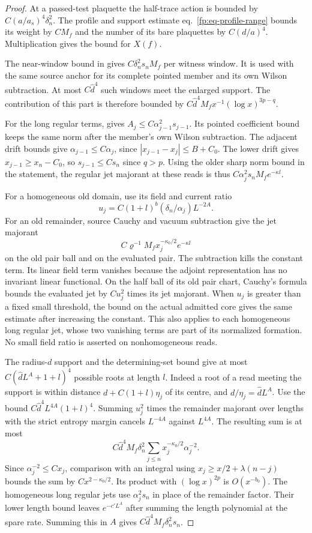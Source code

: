 \documentclass[11pt,letterpaper,reqno]{amsart}
\numberwithin{equation}{section}
\renewcommand{\eqref}[1]{\textup{eq.~\ref{#1}}}
\theoremstyle{definition}
\theoremstyle{remark}
\begin{document}
\begin{proof}
At a passed-test plaquette the half-trace action is bounded
by \(C(a/a_s)^4\delta_n^2\). The profile and support estimate
\eqref{fp:eq-profile-range} bounds its weight by \(CM_f\)
and the number of its bare plaquettes by \(C(d/a)^4\).
Multiplication gives the bound for \(X(f)\).

The near-window bound in \cite[Proposition~5.6]{SI} gives
\(C\delta_n^2s_n M_f\) per witness window. It is used with the
same source anchor for its complete pointed member and its
own Wilson subtraction. At most \(C\widehat d^4\) such windows
meet the enlarged support. The contribution of this part is
therefore bounded by \(C\widehat d^4 M_f x^{-1}
(\log x)^{3p-q}\).

For the long regular terms, \cite[Proposition~5.6]{SI} gives
\(A_j\le C\alpha_{j-1}^2s_{j-1}\). Its pointed coefficient bound
keeps the same norm after the member's own Wilson subtraction.
The adjacent drift bounds give \(\alpha_{j-1}\le C\alpha_j\), since
\(|x_{j-1}-x_j|\le B+C_0\). The lower drift gives
\(x_{j-1}\ge x_n-C_0\), so \(s_{j-1}\le C s_n\) since \(q>p\).
Using the older sharp norm bound in the statement, the regular
jet majorant at these reads is thus
\(C\alpha_j^2s_n M_f e^{-\kappa l}\).

For a homogeneous old domain, use its field and current ratio
\[
 u_j=C(1+l)^b(\delta_n/\alpha_j)L^{-2A}.
\]
For an old remainder, source Cauchy and vacuum subtraction
give the jet majorant
\[
 C\varrho^{-1}M_f x_j^{-\kappa_0/2}e^{-\kappa l}
\]
on the old pair ball and on the evaluated pair. The subtraction
kills the constant term. Its linear field term vanishes because the
adjoint representation has no invariant linear functional.
On the half ball of its old pair chart, Cauchy's formula
bounds the evaluated jet by \(C u_j^2\) times its jet
majorant. When \(u_j\) is greater than a fixed small threshold,
the bound on the actual admitted core gives the same estimate
after increasing the constant. This also applies to each
homogeneous long regular jet, whose two vanishing terms are
part of its normalized formation. No small field ratio is
asserted on nonhomogeneous reads.

The radius-\(d\) support and the determining-set bound give
at most \(C(\widehat d L^A+1+l)^4\) possible roots at length
\(l\). Indeed a root of a read meeting the support is within
distance \(d+C(1+l)\eta_j\) of its centre, and
\(d/\eta_j=\widehat d L^A\). Use the bound
\(C\widehat d^4L^{4A}(1+l)^4\).
Summing \(u_j^2\) times the remainder majorant over lengths
with the strict entropy margin cancels \(L^{-4A}\) against
\(L^{4A}\). The resulting sum is at most
\[
 C\widehat d^4 M_f\delta_n^2
            \sum_{j\le n} x_j^{-\kappa_0/2}\alpha_j^{-2}.
\]
Since \(\alpha_j^{-2}\le Cx_j\), comparison with an integral
using \(x_j\ge x/2+\lambda(n-j)\) bounds the sum by
\(C x^{2-\kappa_0/2}\). Its product with \((\log x)^{2p}\)
is \(O(x^{-b_0})\). The homogeneous long regular jets use
\(\alpha_j^2s_n\) in place of the remainder factor.
Their lower length bound leaves \(e^{-c'L^A}\) after summing
the length polynomial at the spare rate. Summing this in
\(A\) gives \(C\widehat d^4M_f\delta_n^2s_n\).


\end{proof}
\end{document}
